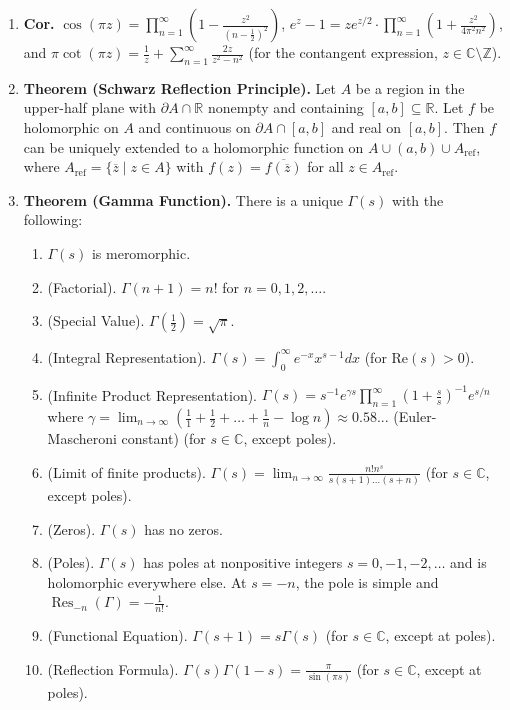 \documentclass[12pt]{article}
\theoremstyle{definition}
\theoremstyle{named}
\DeclareMathOperator{\Res}{Res}
\begin{document}
{\begin{multicols}{2}
\begin{spacing}{1.01}
\begin{enumerate}
    \item \textbf{Cor. } $\cos(\pi z) = \prod_{n=1}^{\infty} \left(1 - \frac{z^2}{\left(n - \frac{1}{2}\right)^2}\right)$, $e^z - 1 = ze^{z/2} \cdot \prod_{n=1}^{\infty} \left(1 + \frac{z^2}{4\pi^2n^2}\right)$, and $\pi\cot(\pi z) = \frac{1}{z} + \sum_{n=1}^{\infty} \frac{2z}{z^2 - n^2}$ (for the contangent expression, $z \in \mathbb{C} \setminus \mathbb{Z}$). 
    \item \textbf{Theorem (Schwarz Reflection Principle). } Let $A$ be a region in the upper-half plane with $\partial A \cap \mathbb{R}$ nonempty and containing $[a,b] \subseteq \mathbb{R}$. Let $f$ be holomorphic on $A$ and continuous on $\partial A \cap [a,b]$ and real on $[a,b]$. Then $f$ can be uniquely extended to a holomorphic function on $A \cup (a,b) \cup A_{\textrm{ref}}$, where $A_{\textrm{ref}} = \{\overline{z} \mid z \in A\}$ with $f(z) = \overline{f(\overline{z})}$ for all $z \in A_{\textrm{ref}}$. 
    \item \textbf{Theorem (Gamma Function). } There is a unique $\Gamma(s)$ with the following: 
    \begin{enumerate}
        \item $\Gamma(s)$ is meromorphic. 
        \item (Factorial). $\Gamma(n+1) = n!$ for $n=0,1,2,\dots$. 
        \item (Special Value). $\Gamma(\frac{1}{2}) = \sqrt{\pi}$. 
        \item (Integral Representation). $\Gamma(s) = \int_{0}^{\infty} e^{-x} x^{s-1} dx$ (for $\textrm{Re}(s) > 0$). 
        \item (Infinite Product Representation). $\Gamma(s) = s^{-1}e^{\gamma s} \prod_{n=1}^{\infty} \left(1 + \frac{s}{s}\right)^{-1} e^{s/n}$ where $\gamma = \lim_{n \to \infty} \left(\frac{1}{1} + \frac{1}{2} + \dots + \frac{1}{n} - \log n\right) \approx 0.58...$ (Euler-Mascheroni constant) (for $s \in \mathbb{C}$, except poles). 
        \item (Limit of finite products). $\Gamma(s) = \lim_{n \to \infty} \frac{n! n^s}{s(s+1)\dots(s+n)}$ (for $s \in \mathbb{C}$, except poles). 
        \item (Zeros). $\Gamma(s)$ has no zeros. 
        \item (Poles). $\Gamma(s)$ has poles at nonpositive integers $s=0,-1,-2,\dots$ and is holomorphic everywhere else. At $s=-n$, the pole is simple and $\Res_{-n}(\Gamma) = -\frac{1}{n!}$. 
        \item (Functional Equation). $\Gamma(s+1) = s\Gamma(s)$ (for $s \in \mathbb{C}$, except at poles). 
        \item (Reflection Formula). $\Gamma(s)\Gamma(1-s) = \frac{\pi}{\sin(\pi s)}$ (for $s \in \mathbb{C}$, except at poles). 
        

\end{enumerate}
\end{enumerate}
\end{spacing}
\end{multicols}}
\end{document}
